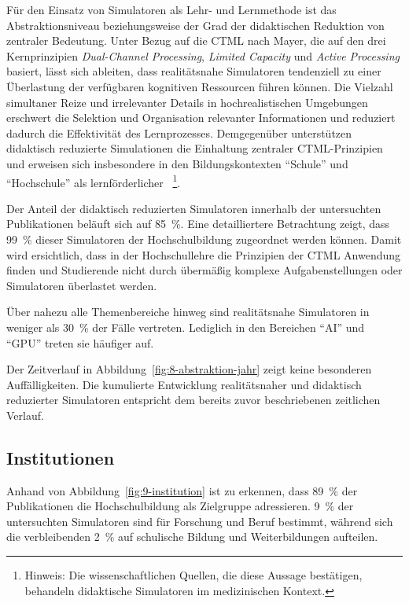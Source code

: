 Für den Einsatz von Simulatoren als Lehr- und Lernmethode ist das Abstraktionsniveau beziehungsweise der Grad der didaktischen Reduktion von zentraler Bedeutung. Unter Bezug auf die \ac{CTML} nach Mayer, die auf den drei Kernprinzipien \textit{Dual-Channel Processing}, \textit{Limited Capacity} und \textit{Active Processing} basiert, lässt sich ableiten, dass realitätsnahe Simulatoren tendenziell zu einer Überlastung der verfügbaren kognitiven Ressourcen führen können. Die Vielzahl simultaner Reize und irrelevanter Details in hochrealistischen Umgebungen erschwert die Selektion und Organisation relevanter Informationen und reduziert dadurch die Effektivität des Lernprozesses. Demgegenüber unterstützen didaktisch reduzierte Simulationen die Einhaltung zentraler \ac{CTML}-Prinzipien und erweisen sich insbesondere in den Bildungskontexten \enquote{Schule} und \enquote{Hochschule} als lernförderlicher \parencites[S.~169]{tremblay_task_2023}[S.~955]{haji_thrive_2016}[S.~360]{reedy_using_2015}~\footnote{Hinweis: Die wissenschaftlichen Quellen, die diese Aussage bestätigen, behandeln didaktische Simulatoren im medizinischen Kontext.}.

Der Anteil der didaktisch reduzierten Simulatoren innerhalb der untersuchten Publikationen beläuft sich auf 85~\%. Eine detailliertere Betrachtung zeigt, dass 99~\% dieser Simulatoren der Hochschulbildung zugeordnet werden können. Damit wird ersichtlich, dass in der Hochschullehre die Prinzipien der \ac{CTML} Anwendung finden und Studierende nicht durch übermäßig komplexe Aufgabenstellungen oder Simulatoren überlastet werden.

Über nahezu alle Themenbereiche hinweg sind realitätsnahe Simulatoren in weniger als 30~\% der Fälle vertreten. Lediglich in den Bereichen \enquote{AI} und \enquote{GPU} treten sie häufiger auf.

Der Zeitverlauf in Abbildung~\ref{fig:8-abstraktion-jahr} zeigt keine besonderen Auffälligkeiten. Die kumulierte Entwicklung realitätsnaher und didaktisch reduzierter Simulatoren entspricht dem bereits zuvor beschriebenen zeitlichen Verlauf.

\subsection{Institutionen}

Anhand von Abbildung~\ref{fig:9-institution} ist zu erkennen, dass 89~\% der Publikationen die Hochschulbildung als Zielgruppe adressieren. 9~\% der untersuchten Simulatoren sind für Forschung und Beruf bestimmt, während sich die verbleibenden 2~\% auf schulische Bildung und Weiterbildungen aufteilen.

